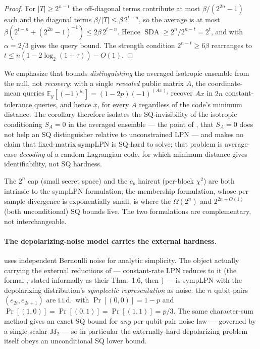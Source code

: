 \documentclass[11pt,a4paper]{article}
\theoremstyle{plain}
\theoremstyle{definition}
\newcommand{\E}{\mathbb{E}}
\DeclareMathOperator{\SDA}{SDA}
\begin{document}
\begin{proof}
For $|T| \geq 2^{n-t}$ the off-diagonal terms contribute at most $\beta/(2^{2n}-1)$ each and the diagonal terms $\beta/|T| \leq \beta\, 2^{t-n}$, so the average is at most $\beta(2^{t-n} + (2^{2n}-1)^{-1}) \leq 2\beta\, 2^{t-n}$. Hence $\SDA \geq 2^n/2^{n-t} = 2^t$, and  with $\alpha = 2/3$ gives the query bound. The strength condition $2^{n-t} \geq 6\beta$ rearranges to $t \leq n(1 - 2\log_2(1+\tau)) - O(1)$.
\end{proof}

We emphasize that  bounds \emph{distinguishing} the averaged isotropic ensemble from the null, not \emph{recovery}: with a single \emph{revealed} public matrix $A$, the coordinate-mean queries $\E_y[(-1)^{y_i}] = (1-2p)(-1)^{(Ax)_i}$ recover $Ax$ in $2n$ constant-tolerance queries, and hence $x$, for every $A$ regardless of the code's minimum distance. The corollary therefore isolates the SQ-invisibility of the isotropic conditioning $S_A = 0$ in the averaged ensemble --- the point of , that $S_A=0$ does not help an SQ distinguisher relative to unconstrained LPN --- and makes no claim that fixed-matrix sympLPN is SQ-hard to solve; that problem is average-case \emph{decoding} of a random Lagrangian code, for which minimum distance gives identifiability, not SQ hardness.

The $2^n$ cap (small secret space) and the $c_p$ haircut (per-block $\chi^2$) are both intrinsic to the sympLPN formulation; the membership formulation, whose per-sample divergence is exponentially small, is where the $\Omega(2^n)$ and $2^{2n-O(1)}$ (both unconditional) SQ bounds live. The two formulations are complementary, not interchangeable.

\paragraph{The depolarizing-noise model carries the external hardness.}  uses independent Bernoulli noise for analytic simplicity. The object actually carrying the external reductions of \cite{KLP+25,LPQR26} --- constant-rate LPN reduces to it (the formal \cite[Thm.\ 6.4]{KLP+25}, stated informally as their Thm.~1.6, then \cite[Thm.\ 4.1]{LPQR26}) --- is sympLPN with the depolarizing distribution's \emph{symplectic representation} as noise: the $n$ qubit-pairs $(e_{2i},e_{2i+1})$ are i.i.d.\ with $\Pr[(0,0)]=1-p$ and $\Pr[(1,0)]=\Pr[(0,1)]=\Pr[(1,1)]=p/3$. The same character-sum method gives an exact SQ bound for \emph{any} per-qubit-pair noise law --- governed by a single scalar $M_2$ --- so in particular the externally-hard depolarizing problem itself obeys an unconditional SQ lower bound.
\end{document}
